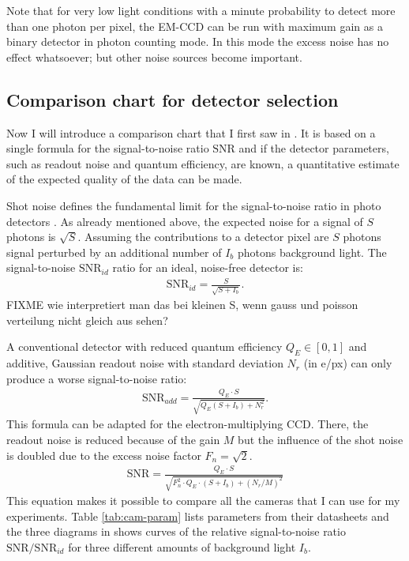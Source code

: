 Note that for very low light conditions with a minute probability to
detect more than one photon per pixel, the EM-CCD can be run with
maximum gain as a binary detector in photon counting mode. In this
mode the excess noise has no effect whatsoever; but other noise
sources become important.

\newcommand{\SNRid}{\textrm{SNR}_{id}}
\newcommand{\SNRadd}{\textrm{SNR}_{add}}
\newcommand{\SNR}{\textrm{SNR}}
\subsection{Comparison chart for detector selection}
Now I will introduce a comparison chart that I first saw in
\cite{Cameras2012}. It is based on a single formula for the
signal-to-noise ratio $\SNR$ and if the detector parameters, such as
readout noise and quantum efficiency, are known, a quantitative
estimate of the expected quality of the data can be made.

Shot noise defines the fundamental limit for the signal-to-noise ratio
in photo detectors \citep{Sheppard2006a}. As already mentioned above,
the expected noise for a signal of $S$ photons is $\sqrt{S}$. Assuming
the contributions to a detector pixel are $S$ photons signal perturbed
by an additional number of $I_b$ photons background light. The
signal-to-noise $\SNRid$ ratio for an ideal, noise-free detector is:
\begin{align}
  \SNRid = \frac{S}{\sqrt{S+I_b}}.
\end{align}
FIXME wie interpretiert man das bei kleinen S, wenn gauss und poisson
verteilung nicht gleich aus sehen?

A conventional detector with reduced quantum efficiency $Q_E\in[0,1]$
and additive, Gaussian readout noise with standard deviation $N_r$ (in
\unit[]{e/px}) can only produce a worse signal-to-noise ratio:
\begin{align}
  \SNRadd = \frac{Q_E\cdot S}{\sqrt{Q_E(S+I_b)+N_r^2}}.
\end{align}
This formula can be adapted for the electron-multiplying CCD. There,
the readout noise is reduced because of the gain $M$ but the influence
of the shot noise is doubled due to the excess noise factor
$F_n=\sqrt{2}$.
\begin{align}
  \SNR = \frac{Q_E\cdot S}{\sqrt{F_n^2\cdot Q_E \cdot (S+I_b) + (N_r/M)^2}}
\end{align}
This equation makes it possible to compare all the cameras that I can
use for my experiments. Table \ref{tab:cam-param} lists parameters
from their datasheets and the three diagrams in
 shows curves of the relative signal-to-noise
ratio $\SNR/\SNRid$ for three different amounts of background light
$I_b$.

